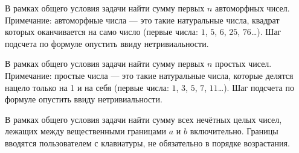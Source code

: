 
\begin{zztask}
В рамках общего условия задачи найти сумму первых $n$ автоморфных чисел.
Примечание:
автоморфные числа --- это такие натуральные числа, квадрат которых
оканчивается на само число (первые числа: $1$, $5$, $6$, $25$, $76$\dots).
Шаг подсчета по формуле опустить ввиду нетривиальности.  
\end{zztask}


\begin{zztask}
В рамках общего условия задачи найти сумму первых $n$ простых чисел.
Примечание: простые
числа --- это такие натуральные числа, которые делятся нацело только на 1 и
на себя (первые числа: $1$, $3$, $5$, $7$, $11$\dots).
Шаг подсчета по формуле опустить ввиду нетривиальности.
\end{zztask}


\begin{zztask}
В рамках общего условия задачи найти сумму всех нечётных целых чисел,
лежащих между вещественными границами $a$ и $b$ включительно. Границы вводятся
пользователем с клавиатуры, не обязательно в порядке возрастания.
\end{zztask}


